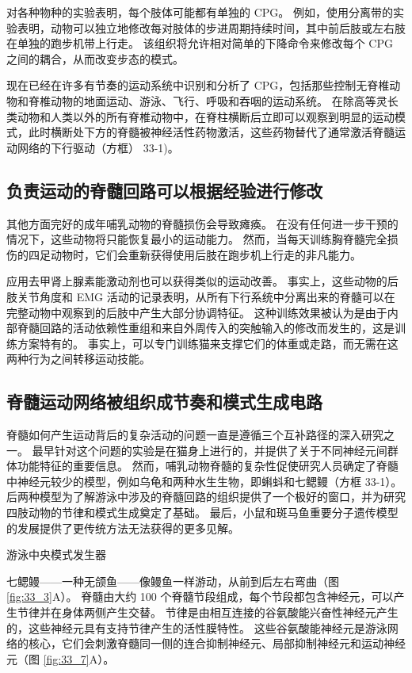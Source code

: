 对各种物种的实验表明，每个肢体可能都有单独的 CPG。 例如，使用分离带的实验表明，动物可以独立地修改每对肢体的步进周期持续时间，其中前后肢或左右肢在单独的跑步机带上行走。 该组织将允许相对简单的下降命令来修改每个 CPG 之间的耦合，从而改变步态的模式。

现在已经在许多有节奏的运动系统中识别和分析了 CPG，包括那些控制无脊椎动物和脊椎动物的地面运动、游泳、飞行、呼吸和吞咽的运动系统。 在除高等灵长类动物和人类以外的所有脊椎动物中，在脊柱横断后立即可以观察到明显的运动模式，此时横断处下方的脊髓被神经活性药物激活，这些药物替代了通常激活脊髓运动网络的下行驱动（方框） 33-1)。

\subsection{负责运动的脊髓回路可以根据经验进行修改}
其他方面完好的成年哺乳动物的脊髓损伤会导致瘫痪。 在没有任何进一步干预的情况下，这些动物将只能恢复最小的运动能力。 然而，当每天训练胸脊髓完全损伤的四足动物时，它们会重新获得使用后肢在跑步机上行走的非凡能力。

应用去甲肾上腺素能激动剂也可以获得类似的运动改善。 事实上，这些动物的后肢关节角度和 EMG 活动的记录表明，从所有下行系统中分离出来的脊髓可以在完整动物中观察到的后肢中产生大部分协调特征。 这种训练效果被认为是由于内部脊髓回路的活动依赖性重组和来自外周传入的突触输入的修改而发生的，这是训练方案特有的。 事实上，可以专门训练猫来支撑它们的体重或走路，而无需在这两种行为之间转移运动技能。




\subsection{脊髓运动网络被组织成节奏和模式生成电路}

脊髓如何产生运动背后的复杂活动的问题一直是遵循三个互补路径的深入研究之一。 最早针对这个问题的实验是在猫身上进行的，并提供了关于不同神经元间群体功能特征的重要信息。 然而，哺乳动物脊髓的复杂性促使研究人员确定了脊髓中神经元较少的模型，例如乌龟和两种水生生物，即蝌蚪和七鳃鳗（方框 33-1）。 后两种模型为了解游泳中涉及的脊髓回路的组织提供了一个极好的窗口，并为研究四肢动物的节律和模式生成奠定了基础。 最后，小鼠和斑马鱼重要分子遗传模型的发展提供了更传统方法无法获得的更多见解。

游泳中央模式发生器

七鳃鳗——一种无颌鱼——像鳗鱼一样游动，从前到后左右弯曲（图 \ref{fig:33_3}A）。 脊髓由大约 100 个脊髓节段组成，每个节段都包含神经元，可以产生节律并在身体两侧产生交替。 节律是由相互连接的谷氨酸能兴奋性神经元产生的，这些神经元具有支持节律产生的活性膜特性。 
这些谷氨酸能神经元是游泳网络的核心，它们会刺激脊髓同一侧的连合抑制神经元、局部抑制神经元和运动神经元（图 \ref{fig:33_7}A）。

